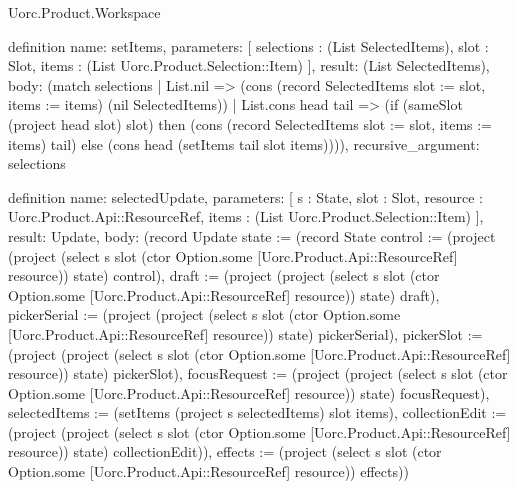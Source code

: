 \begin{lexlean}{Uorc.Product.Workspace}
\begin{semanticmodule}
definition{
  name: setItems,
  parameters: [
    selections : (List SelectedItems),
    slot : Slot,
    items : (List Uorc.Product.Selection::Item)
  ],
  result: (List SelectedItems),
  body: (match selections
    | List.nil => (cons (record SelectedItems {slot := slot, items := items}) (nil SelectedItems))
    | List.cons head tail => (if (sameSlot (project head slot) slot) then (cons (record SelectedItems {slot := slot, items := items}) tail) else (cons head (setItems tail slot items)))),
  recursive_argument: selections
}

definition{
  name: selectedUpdate,
  parameters: [
    s : State,
    slot : Slot,
    resource : Uorc.Product.Api::ResourceRef,
    items : (List Uorc.Product.Selection::Item)
  ],
  result: Update,
  body: (record Update {state := (record State {control := (project (project (select s slot (ctor Option.some [Uorc.Product.Api::ResourceRef] resource)) state) control), draft := (project (project (select s slot (ctor Option.some [Uorc.Product.Api::ResourceRef] resource)) state) draft), pickerSerial := (project (project (select s slot (ctor Option.some [Uorc.Product.Api::ResourceRef] resource)) state) pickerSerial), pickerSlot := (project (project (select s slot (ctor Option.some [Uorc.Product.Api::ResourceRef] resource)) state) pickerSlot), focusRequest := (project (project (select s slot (ctor Option.some [Uorc.Product.Api::ResourceRef] resource)) state) focusRequest), selectedItems := (setItems (project s selectedItems) slot items), collectionEdit := (project (project (select s slot (ctor Option.some [Uorc.Product.Api::ResourceRef] resource)) state) collectionEdit)}), effects := (project (select s slot (ctor Option.some [Uorc.Product.Api::ResourceRef] resource)) effects)})
}


\end{semanticmodule}
\end{lexlean}
